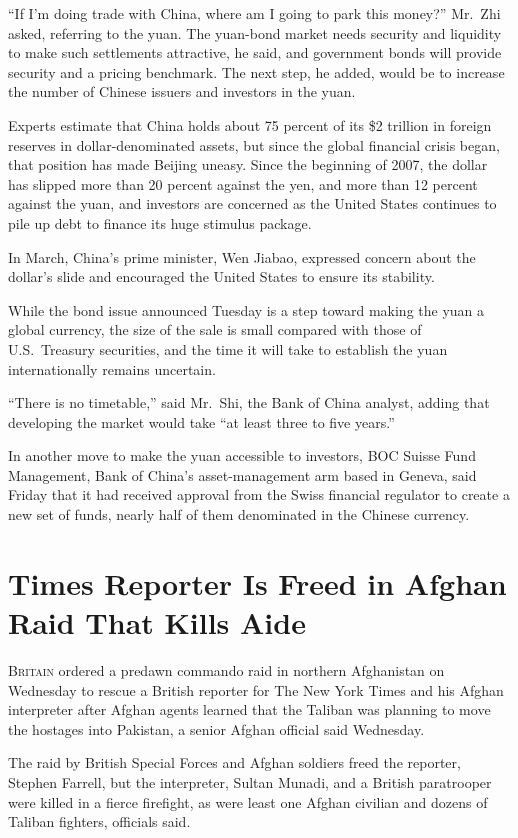 ﻿\documentclass[12pt]{article}
\begin{document}
``If I'm doing trade with China, where am I going to park this money?'' Mr.~Zhi asked, referring to
the yuan. The yuan-bond market needs security and liquidity to make such settlements attractive, he
said, and government bonds will provide security and a pricing benchmark. The next step, he added,
would be to increase the number of Chinese issuers and investors in the yuan.

Experts estimate that China holds about 75 percent of its \$2 trillion in foreign reserves in
dollar-denominated assets, but since the global financial crisis began, that position has made
Beijing uneasy. Since the beginning of 2007, the dollar has slipped more than 20 percent against the
yen, and more than 12 percent against the yuan, and investors are concerned as the United States
continues to pile up debt to finance its huge stimulus package.

In March, China's prime minister, Wen Jiabao, expressed concern about the dollar's slide and
encouraged the United States to ensure its stability.

While the bond issue announced Tuesday is a step toward making the yuan a global currency, the size
of the sale is small compared with those of U.S.~Treasury securities, and the time it will take to
establish the yuan internationally remains uncertain.

``There is no timetable,'' said Mr.~Shi, the Bank of China analyst, adding that developing the
market would take ``at least three to five years.''

In another move to make the yuan accessible to investors, BOC Suisse Fund Management, Bank of
China's asset-management arm based in Geneva, said Friday that it had received approval from the
Swiss financial regulator to create a new set of funds, nearly half of them denominated in the
Chinese currency.

\section{Times Reporter Is Freed in Afghan Raid That Kills Aide}

\lettrine{B}{ritain} ordered a predawn commando raid in northern Afghanistan on Wednesday to rescue
a British reporter for The New York Times and his Afghan interpreter after Afghan agents learned
that the Taliban was planning to move the hostages into Pakistan, a senior Afghan official said
Wednesday.

The raid by British Special Forces and Afghan soldiers freed the reporter, Stephen Farrell, but the
interpreter, Sultan Munadi, and a British paratrooper were killed in a fierce firefight, as were
least one Afghan civilian and dozens of Taliban fighters, officials said.
\end{document}
